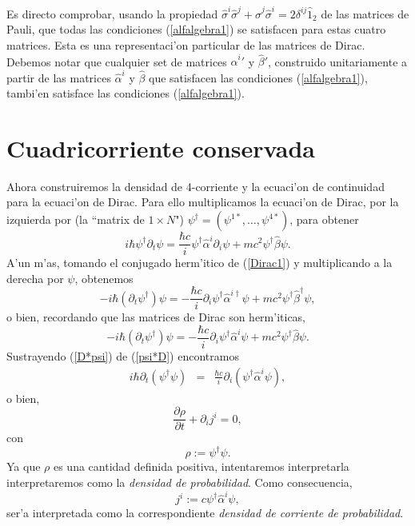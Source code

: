 Es directo comprobar, usando la propiedad
$\hat{\sigma}^i\hat{\sigma}^{j}+\hat{\sigma}^{j}\hat{\sigma}^i
=2\delta^{ij}\hat{1}_2$ de las matrices de Pauli, que todas las condiciones
(\ref{alfalgebra1}) se satisfacen para estas cuatro matrices. Esta es una
representaci'on particular de las matrices de Dirac. Debemos notar que cualquier
set de matrices $\hat{\alpha}^i\prime$ y $\hat{\beta}\prime$, construido
unitariamente a partir de las matrices $\hat{\alpha}^i$ y $\hat{\beta}$ que
satisfacen las condiciones (\ref{alfalgebra1}), tambi'en satisface las
condiciones (\ref{alfalgebra1}). 

\section{Cuadricorriente conservada}
Ahora construiremos la densidad de 4-corriente y la ecuaci'on de continuidad
para la ecuaci'on de Dirac. Para ello multiplicamos la ecuaci'on de Dirac,
por la izquierda por (la ``matrix de $1\times N$") $\psi^{\dagger
}=(\psi^{1*},\dots,\psi^{4*})$, para obtener 
\begin{equation}
i\hbar \psi^{\dagger }\partial_t \psi=\frac{\hbar c}{i}\psi
^{\dagger}\hat{\alpha}^i\partial_i \psi+mc^2\psi^{\dagger }\hat{\beta}\psi
. \label{psi*D}
\end{equation}
A'un m'as, tomando el conjugado herm'itico de (\ref{Dirac1}) y multiplicando a
la derecha por $\psi $, obtenemos
\begin{equation}
-i\hbar (\partial_t\psi^{\dagger })\psi =-\frac{\hbar
c}{i}\partial_i\psi^{\dagger }\hat{\alpha}^{i\dagger }\psi +mc^2\psi^{\dagger
}\hat{\beta}^{\dagger }\psi ,
\end{equation}
o bien, recordando que las matrices de Dirac son herm'iticas, 
\begin{equation}
-i\hbar (\partial_t\psi^{\dagger })\psi =-\frac{\hbar
c}{i}\partial_i\psi^{\dagger }\hat{\alpha}^i\psi +mc^2\psi^{\dagger
}\hat{\beta}\psi. \label{D*psi}
\end{equation}
Sustrayendo (\ref{D*psi}) de (\ref{psi*D}) encontramos 
\begin{eqnarray*}
i\hbar \partial_t(\psi^{\dagger }\psi)&=&\frac{\hbar
c}{i}\partial_i(\psi^{\dagger }\hat{\alpha}^i\psi) ,
\end{eqnarray*}
o bien, 
\begin{equation}
\frac{\partial \rho }{\partial t}+\partial _ij^i=0, \label{cont1}
\end{equation}
con
\begin{equation}
\rho :=\psi^{\dagger }\psi .\label{rho}
\end{equation}
Ya que $\rho$ es una cantidad definida positiva, intentaremos
interpretarla interpretaremos como la \emph{densidad de probabilidad}. Como
consecuencia,
\begin{equation}
j^i:=c\psi^{\dagger }\hat{\alpha}^i\psi, \label{jota}
\end{equation}
ser'a interpretada como la correspondiente \emph{densidad de corriente de
probabilidad}. 

